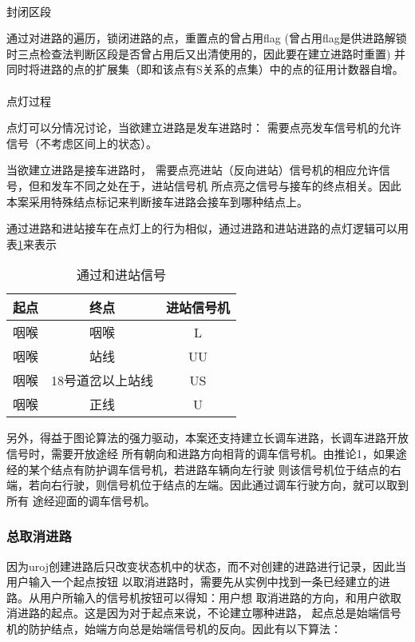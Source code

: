 \paragraph{}封闭区段

通过对进路的遍历，锁闭进路的点，重置点的曾占用flag
(曾占用flag是供进路解锁时三点检查法判断区段是否曾占用后又出清使用的，因此要在建立进路时重置)
并同时将进路的点的扩展集（即和该点有S关系的点集）中的点的征用计数器自增。

\paragraph{}点灯过程

点灯可以分情况讨论，当欲建立进路是发车进路时：
需要点亮发车信号机的允许信号（不考虑区间上的状态）。

当欲建立进路是接车进路时，
需要点亮进站（反向进站）信号机的相应允许信号，但和发车不同之处在于，进站信号机
所点亮之信号与接车的终点相关。因此本案采用特殊结点标记来判断接车进路会接车到哪种结点上。

通过进路和进站接车在点灯上的行为相似，通过进路和进站进路的点灯逻辑可以用表\ref{homw_light}来表示

\begin{table}[htpb!]
    \centering
    \caption{\label{homw_light}通过和进站信号}
    \begin{threeparttable}
        \begin{tabular}{ccc}
            \toprule
            起点 & 终点             & 进站信号机 \\
            \midrule
            咽喉 & 咽喉             & L          \\
            咽喉 & 站线             & UU         \\
            咽喉 & 18号道岔以上站线 & US         \\
            咽喉 & 正线             & U          \\
            \bottomrule
        \end{tabular}
    \end{threeparttable}
\end{table}

另外，得益于图论算法的强力驱动，本案还支持建立长调车进路，长调车进路开放信号时，需要开放途经
所有朝向和进路方向相背的调车信号机。由推论1，如果途经的某个结点有防护调车信号机，若进路车辆向左行驶
则该信号机位于结点的右端，若向右行驶，则信号机位于结点的左端。因此通过调车行驶方向，就可以取到所有
途经迎面的调车信号机。

\subsubsection{总取消进路}
因为uroj创建进路后只改变状态机中的状态，而不对创建的进路进行记录，因此当用户输入一个起点按钮
以取消进路时，需要先从实例中找到一条已经建立的进路。从用户所输入的信号机按钮可以得知：用户想
取消进路的方向，和用户欲取消进路的起点。这是因为对于起点来说，不论建立哪种进路，
起点总是始端信号机的防护结点，始端方向总是始端信号机的反向。因此有以下算法：


